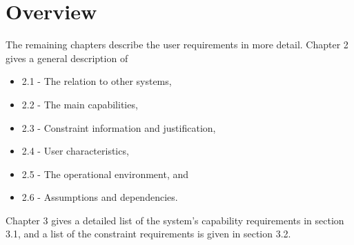 



\section{Overview}

The remaining chapters describe the user requirements in more detail. Chapter 2 gives a general description of
\begin{itemize}
\item 2.1 - The relation to other systems,
\item 2.2 - The main capabilities,
\item 2.3 - Constraint information and justification,
\item 2.4 - User characteristics,
\item 2.5 - The operational environment, and
\item 2.6 - Assumptions and dependencies.
\end{itemize}

Chapter 3 gives a detailed list of the system's capability requirements in section 3.1, and a list of the constraint requirements is given in section 3.2.


